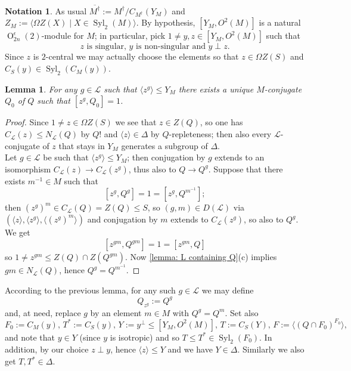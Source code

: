 \documentclass{amsart}
\numberwithin{equation}{section}
\newtheorem{lemma}[equation]{Lemma}
\theoremstyle{definition}
\newtheorem{notation}[equation]{Notation}
\theoremstyle{subresult}
\theoremstyle{caseresult}
\renewcommand{\L}{\mathcal{L}}
\newcommand{\Syl}{\operatorname{Syl}}
\renewcommand{\O}{\operatorname{O}}
\newcommand{\ov}{\overline}
\newcommand{\inv}{^{-1}}
\newcommand{\fto}{\longrightarrow}
\newcommand{\<}{\langle}
\renewcommand{\>}{\rangle}
\begin{document}
\begin{notation}\label{notation: orthogonal case}
	As usual $\ov{M^\dagger} := M^\dagger / C_{M^\dagger}(Y_M)$ and $Z_M := \< \Omega Z(X) \mid X \in \Syl_2(M) \>$. By hypothesis, $[Y_M, O^2(M)]$ is a natural $\O^\epsilon_{2n}(2)$-module for $M$; in particular, pick $1 \ne y,z \in [Y_M,O^2(M)]$ such that
	\[
	\text{$z$ is singular, $y$ is non-singular and $y \perp z$.}
	\]
	Since $z$ is $2$-central we may actually choose the elements so that $z \in \Omega Z(S)$ and $C_S(y) \in \Syl_2(C_M(y))$.

    \begin{lemma}\label{lemma:uniquen of some conjug of Q-orthog case}
		For any $g \in \L$ such that $\<z^g\> \le Y_M$ there exists a unique $M$-conjugate $Q_0$ of $Q$ such that $[z^g,Q_0]=1$.
	\end{lemma}
	\begin{proof}
	Since $1 \ne z \in \Omega Z(S)$ we see that $z \in Z(Q)$, so one has $C_\L(z) \le N_\L(Q)$ by $Q!$ and $\< z \> \in \Delta$ by $Q$-repleteness; then also every $\L$-conjugate of $z$ that stays in $Y_M$ generates a subgroup of $\Delta$.\\
	Let $g \in \L$ be such that $\<z^g\> \le Y_M$; then conjugation by $g$ extends to an isomorphism $C_\L(z) \fto C_\L(z^g)$, thus also to $Q \fto Q^g$. Suppose that there exists $m\inv \in M$ such that 
	\[
	[z^g,Q^g]=1=[z^g,Q^{m\inv}];
	\]
	then $(z^g)^m \in C_\L(Q)=Z(Q) \le S$, so $(g,m) \in D(\L)$ via $(\<z\>,\<z^g\>,\<(z^g)^m\> )$ and conjugation by $m$ extends to $C_\L(z^g)$, so also to $Q^g$. We get
	\[
	[z^{gm},Q^{gm}]=1=[z^{gm},Q]
	\]
	so $1 \ne z^{gm} \le Z(Q) \cap Z(Q^{gm})$. Now \ref{lemma: L containing Q}(c) implies $gm \in N_\L(Q)$, hence $Q^g = Q^{m\inv}$.		
	\end{proof}
	According to the previous lemma, for any such $g \in \L$ we may define
	\[
	Q_{z^g} := Q^g
	\]
    and, at need, replace $g$ by an element $m \in M$ with $Q^g=Q^m$. Set also
	\[
	F_0 := C_M(y), \, T^*:=C_S(y), \, Y := y^\perp \le [Y_M, O^2(M)], \, T:= C_S(Y) , \, F:= \< (Q \cap F_0)^{F_0} \>,
	\]
	and note that $y \in Y$ (since $y$ is isotropic) and so $T \le T^* \in \Syl_2(F_0)$. In addition, by our choice $z \perp y$, hence $\<z\> \le Y$ and we have $Y \in \Delta$. Similarly we also get $T,T^* \in \Delta$.
\end{notation}
\end{document}

